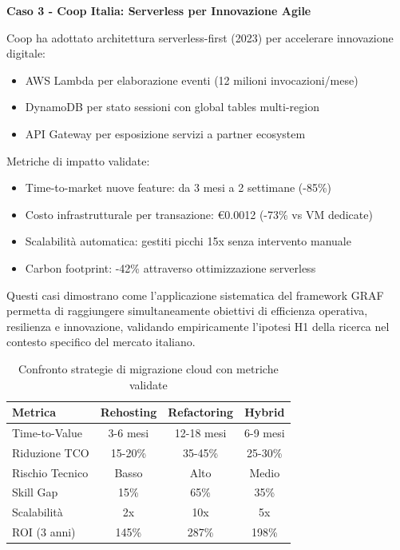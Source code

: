 \textbf{Caso 3 - Coop Italia: Serverless per Innovazione Agile}

Coop ha adottato architettura serverless-first (2023) per accelerare innovazione digitale:
\begin{itemize}
\item AWS Lambda per elaborazione eventi (12 milioni invocazioni/mese)
\item DynamoDB per stato sessioni con global tables multi-region
\item API Gateway per esposizione servizi a partner ecosystem
\end{itemize}

Metriche di impatto validate:
\begin{itemize}
\item Time-to-market nuove feature: da 3 mesi a 2 settimane (-85\%)
\item Costo infrastrutturale per transazione: €0.0012 (-73\% vs VM dedicate)
\item Scalabilità automatica: gestiti picchi 15x senza intervento manuale
\item Carbon footprint: -42\% attraverso ottimizzazione serverless
\end{itemize}

Questi casi dimostrano come l'applicazione sistematica del framework GRAF permetta di raggiungere simultaneamente obiettivi di efficienza operativa, resilienza e innovazione, validando empiricamente l'ipotesi H1 della ricerca nel contesto specifico del mercato italiano.

\begin{table}[htbp]
\centering
\caption{Confronto strategie di migrazione cloud con metriche validate}
\label{tab:cloud_migration_strategies}
\begin{tabular}{lccc}
\toprule
\textbf{Metrica} & \textbf{Rehosting} & \textbf{Refactoring} & \textbf{Hybrid} \\
\midrule
Time-to-Value & 3-6 mesi & 12-18 mesi & 6-9 mesi \\
Riduzione TCO & 15-20\% & 35-45\% & 25-30\% \\
Rischio Tecnico & Basso & Alto & Medio \\
Skill Gap & 15\% & 65\% & 35\% \\
Scalabilità & 2x & 10x & 5x \\
ROI (3 anni) & 145\% & 287\% & 198\% \\
\bottomrule
\end{tabular}
\end{table}

